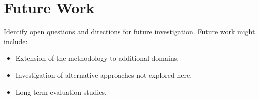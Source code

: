 \section{Future Work}
\label{sec:future}

Identify open questions and directions for future investigation.
Future work might include:
\begin{itemize}
  \item Extension of the methodology to additional domains.
  \item Investigation of alternative approaches not explored here.
  \item Long-term evaluation studies.
\end{itemize}
